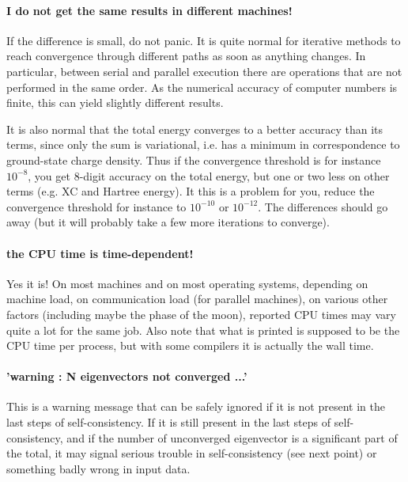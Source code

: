 \documentclass[12pt,a4paper]{article}
\begin{document}
\paragraph{I do not get the same results in different machines!}
If the difference is small, do not panic. It is quite normal for
iterative methods to reach convergence through different paths as soon
as anything changes. In particular, between serial and parallel
execution there are operations that are not performed in the same
order. As the numerical accuracy of computer numbers is finite, this
can yield slightly different results. 

It is also normal that the total energy converges to a better accuracy
than its terms, since only the sum is variational, i.e. has a minimum
in correspondence to ground-state charge density. Thus if the
convergence threshold is for instance $10^{-8}$, you get 8-digit
accuracy on the total energy, but one or two less on other terms
(e.g. XC and Hartree energy). It this is a problem for you, reduce the
convergence threshold for instance to  $10^{-10}$ or  $10^{-12}$. The
differences should go away (but it will probably take a few more
iterations to converge). 

\paragraph{the CPU time is time-dependent!}
Yes it is! On most machines and on
most operating systems, depending on machine load, on communication load
(for parallel machines), on various other factors (including maybe the phase
of the moon), reported CPU times may vary quite a lot for the same job.
Also note that what is printed is supposed to be the CPU time per process,
but with some compilers it is actually the wall time.

\paragraph{'warning : N eigenvectors not converged ...'}
This is a warning message that can be safely ignored if it is not
present in the last steps of self-consistency. If it is still present
in the last steps of self-consistency, and if the number of
unconverged eigenvector is a significant part of the total, it may
signal serious trouble in self-consistency (see next point) or
something badly wrong in input data.
\end{document}
